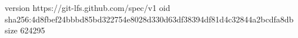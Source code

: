version https://git-lfs.github.com/spec/v1
oid sha256:4d8fbef24bbbd85bd322754e8028d330d63df38394df81d4c32844a2bcdfa8db
size 624295
